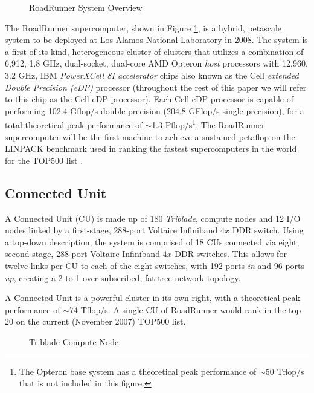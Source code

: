 \documentclass[letter,10pt]{article}
\begin{document}
\begin{figure}
    \begin{center}
    \scalebox{0.3}{}
    \caption{RoadRunner System Overview}
    \label{fig:system}
    \end{center}
\end{figure}

The RoadRunner supercomputer, shown in Figure \ref{fig:system},
is a hybrid, petascale system to be deployed at Los Alamos National
Laboratory in 2008.  The system is a first-of-its-kind, heterogeneous
cluster-of-clusters that utilizes a combination of 6,912, 1.8 GHz,
dual-socket, dual-core AMD Opteron \emph{host} processors with 12,960,
3.2 GHz, IBM \emph{PowerXCell 8I accelerator} chips also known as the
Cell \emph{extended Double Precision (eDP)} processor (throughout the
rest of this paper we will refer to this chip as the Cell eDP processor).
Each Cell eDP processor is capable of performing 102.4 Gflop/s
double-precision (204.8 GFlop/s single-precision), for a total
theoretical peak performance of $\sim$1.3 Pflop/s\footnote{The Opteron
base system has a theoretical peak performance of $\sim$50 Tflop/s that
is not included in this figure.}.
The RoadRunner supercomputer will be the first machine to achieve a
sustained petaflop on the LINPACK benchmark used in ranking the
fastest supercomputers in the world for the TOP500 list \cite{top500}.

\subsection*{Connected Unit}

A Connected Unit (CU) is made up of 180 \emph{Triblade}, compute
nodes and 12 I/O nodes linked by a first-stage, 288-port Voltaire
Infiniband $4x$ DDR switch.  Using a top-down description, the
system is comprised of 18 CUs connected via eight, second-stage,
288-port Voltaire Infiniband $4x$ DDR switches.  This allows for
twelve links per CU to each of the eight switches, with 192 ports
\emph{in} and 96 ports \emph{up}, creating a 2-to-1 over-subscribed,
fat-tree network topology.

A Connected Unit is a powerful cluster in 
its own right, with a theoretical peak performance of
$\sim$74 Tflop/s.  A single CU of RoadRunner would rank in the
top 20 on the current (November 2007) TOP500 list.

\begin{figure}
    \begin{center}
    \scalebox{0.2}{}
    \caption{Triblade Compute Node}
    \label{fig:triblade}
    \end{center}
\end{figure}
\end{document}
